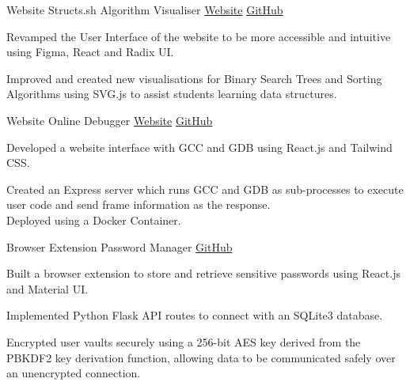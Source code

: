 

\begin{cventries}

  \cventry
    {Website} %
    {Structs.sh Algorithm Visualiser} %
    {\href{https://structs.sh}{\faGlobe Website}} %
    {\href{https://github.com/csesoc/structs.sh}{\faGithub GitHub}} %
    {
      \begin{cvitems} %
        \item {Revamped the User Interface of the website to be more accessible and intuitive using Figma, React and Radix UI.}
        \item {Improved and created new visualisations for Binary Search Trees and Sorting Algorithms using SVG.js to assist students learning data structures.}
      \end{cvitems}
    }

  \cventry
    {Website} %
    {Online Debugger} %
    {\href{https://online-debugger.onrender.com}{\faGlobe Website}} %
    {\href{https://github.com/jedwed/online-debugger}{\faGithub GitHub}} %
    {
      \begin{cvitems} %
        \item {Developed a website interface with GCC and GDB using React.js and Tailwind CSS.}
        \item {Created an Express server which runs GCC and GDB as sub-processes to execute user code and send frame information as the response.\\ Deployed using a Docker Container.}
      \end{cvitems}
    }

    \cventry
    {Browser Extension} %
    {Password Manager} %
    {} %
    {\href{https://github.com/jedwed/bitnurture}{\faGithub GitHub}} %
    {
      \begin{cvitems} %
        \item {Built a browser extension to store and retrieve sensitive passwords using React.js and Material UI.}
        \item {Implemented Python Flask API routes to connect with an SQLite3 database.}
        \item {Encrypted user vaults securely using a 256-bit AES key derived from the PBKDF2 key derivation function, allowing data to be communicated safely over an unencrypted connection.}
      \end{cvitems}
    }

\end{cventries}
